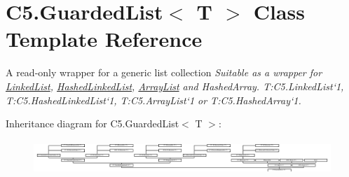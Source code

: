 \hypertarget{class_c5_1_1_guarded_list}{}\section{C5.\+Guarded\+List$<$ T $>$ Class Template Reference}
\label{class_c5_1_1_guarded_list}


A read-\/only wrapper for a generic list collection {\itshape Suitable as a wrapper for \hyperlink{class_c5_1_1_linked_list}{Linked\+List}, \hyperlink{class_c5_1_1_hashed_linked_list}{Hashed\+Linked\+List}, \hyperlink{class_c5_1_1_array_list}{Array\+List} and Hashed\+Array. T\+:\+C5.\+Linked\+List`1, T\+:\+C5.\+Hashed\+Linked\+List`1, T\+:\+C5.\+Array\+List`1 or T\+:\+C5.\+Hashed\+Array`1. }  


Inheritance diagram for C5.\+Guarded\+List$<$ T $>$\+:\begin{figure}[H]
\begin{center}
\leavevmode
\includegraphics[height=1.314554cm]{class_c5_1_1_guarded_list}
\end{center}
\end{figure}
